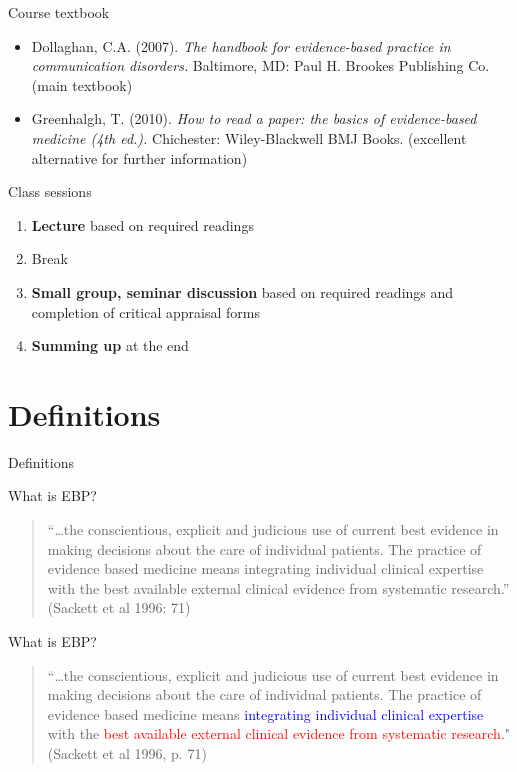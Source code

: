 \documentclass{beamer}
\begin{document}
\begin{frame}{Course textbook}
	\begin{itemize}
	\item Dollaghan, C.A. (2007). \emph{The handbook for evidence-based practice in communication disorders.} Baltimore, MD: Paul H. Brookes Publishing Co. (main textbook)
	\item Greenhalgh, T. (2010). \emph{How to read a paper: the basics of evidence-based medicine (4th ed.).} Chichester: Wiley-Blackwell BMJ Books. (excellent alternative for further information)
	\end{itemize}
\end{frame}

\begin{frame}{Class sessions}
	\begin{enumerate}
	\item \textbf{Lecture} based on required readings 
	\item Break
	\item \textbf{Small group, seminar discussion} based on required readings and completion of critical appraisal forms
	\item \textbf{Summing up} at the end
	\end{enumerate}
\end{frame}

\section*{Definitions}

\begin{frame}
\begin{center}
\Huge{Definitions}
\end{center}
\end{frame}

\begin{frame}{What is EBP?}
	\begin{quote}
	``\dots the conscientious, explicit and judicious use of current best evidence in making decisions about the care of individual patients. The practice of evidence based 		medicine means integrating individual clinical expertise with the best available external clinical evidence from systematic research.''  (Sackett et al 1996: 71)
	\end{quote}
\end{frame}

\begin{frame}{What is EBP?}
	\begin{quote}
	``\dots the conscientious, explicit and judicious use of current best evidence in making decisions about the care of individual patients. The practice of evidence based 		medicine means \textcolor{blue}{integrating individual clinical expertise} with the \textcolor{red}{best available external clinical evidence from systematic 			research.}" (Sackett et al 1996, p. 71)
	\end{quote}
\end{frame}
\end{document}
